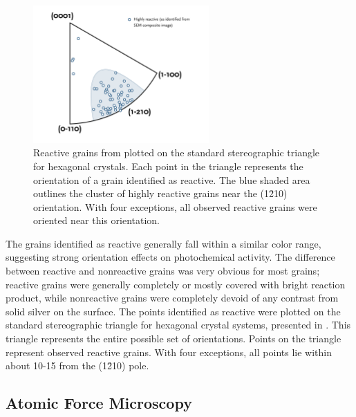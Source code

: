 \begin{figure}
	\centerline{\includegraphics[width=0.6\textwidth]{semtriangle.pdf}}
		\caption[Reactive grains from ]{%
			Reactive grains from  plotted on 
			the standard stereographic triangle for hexagonal crystals. Each 
			point in the triangle represents the orientation of a grain 
			identified as reactive. The blue shaded area outlines the cluster 
			of highly reactive grains near the (1\={2}10) orientation. With 
			four exceptions, all observed reactive grains were oriented near 
			this orientation.}
	\label{fig:semtriangle}
\end{figure}
The grains identified as reactive generally fall within a similar color range, suggesting
strong orientation effects on photochemical activity. The difference between reactive and
nonreactive grains was very obvious for most grains; reactive grains were generally
completely or mostly covered with bright reaction product, while nonreactive grains were
completely devoid of any contrast from solid silver on the surface. The points identified
as reactive were plotted on the standard stereographic triangle for hexagonal crystal
systems, presented in . This triangle represents the entire
possible set of orientations. Points on the triangle represent observed reactive grains.
With four exceptions, all points lie within about 10-15\degree{} from the (1\={2}10) pole.


\subsection{Atomic Force Microscopy}
\label{subsec:ch9afm}


